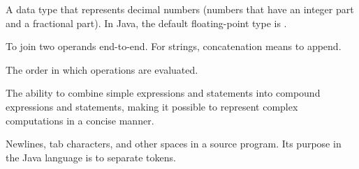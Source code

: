 \begin{description}

A data type that represents decimal numbers (numbers that have an integer part and a fractional part).
In Java, the default floating-point type is .

To join two operands end-to-end.
For strings, concatenation means to append.

The order in which operations are evaluated.

The ability to combine simple expressions and statements into compound expressions and statements, making it possible to represent complex computations in a concise manner.

Newlines, tab characters, and other spaces in a source program.
Its purpose in the Java language is to separate tokens.


\end{description}
